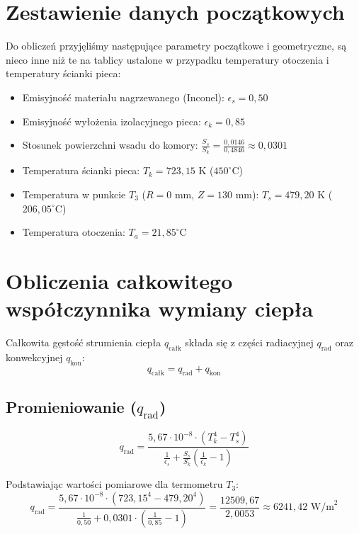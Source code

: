 \documentclass[12pt,a4paper]{article}
\begin{document}
\section{Zestawienie danych początkowych}

Do obliczeń przyjęliśmy następujące parametry początkowe i geometryczne, są nieco inne niż te na tablicy ustalone w przypadku temperatury otoczenia i temperatury ścianki pieca:
\begin{itemize}
    \item Emisyjność materiału nagrzewanego (Inconel): $\epsilon_s = 0{,}50$
    \item Emisyjność wyłożenia izolacyjnego pieca: $\epsilon_k = 0{,}85$
    \item Stosunek powierzchni wsadu do komory: $\frac{S_s}{S_k} = \frac{0{,}0146}{0{,}4846} \approx 0{,}0301$
    \item Temperatura ścianki pieca: $T_k = 723{,}15\text{ K}$ ($450^\circ\text{C}$)
    \item Temperatura w punkcie $T_3$ ($R=0\text{ mm}$, $Z=130\text{ mm}$): $T_s = 479{,}20\text{ K}$ ($206{,}05^\circ\text{C}$)
    \item Temperatura otoczenia: $T_a = 21{,}85^\circ\text{C}$
\end{itemize}

\section{Obliczenia całkowitego współczynnika wymiany ciepła}

Całkowita gęstość strumienia ciepła $q_{\text{całk}}$ składa się z części radiacyjnej $q_{\text{rad}}$ oraz konwekcyjnej $q_{\text{kon}}$:
\begin{equation}
    q_{\text{całk}} = q_{\text{rad}} + q_{\text{kon}}
\end{equation}

\subsection{Promieniowanie ($q_{\text{rad}}$)}
\begin{equation}
    q_{\text{rad}} = \frac{5{,}67 \cdot 10^{-8} \cdot \left( T_k^4 - T_s^4 \right)}{\frac{1}{\epsilon_s} + \frac{S_s}{S_k} \left( \frac{1}{\epsilon_k} - 1 \right)}
\end{equation}

Podstawiając wartości pomiarowe dla termometru $T_3$:
\begin{equation}
    q_{\text{rad}} = \frac{5{,}67 \cdot 10^{-8} \cdot \left( 723{,}15^4 - 479{,}20^4 \right)}{\frac{1}{0{,}50} + 0{,}0301 \cdot \left( \frac{1}{0{,}85} - 1 \right)} = \frac{12509{,}67}{2{,}0053} \approx 6241{,}42 \text{ W/m}^2
\end{equation}
\end{document}

